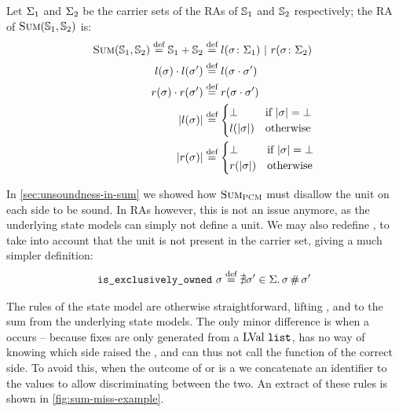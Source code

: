 Let $\Sigma_1$ and $\Sigma_2$ be the carrier sets of the RAs of $\mathbb S_1$ and $\mathbb S_2$ respectively; the RA of $\textsc{Sum}(\mathbb S_1,\mathbb S_2)$ is:
\begin{align*}
	\textsc{Sum}(\mathbb S_1, \mathbb S_2) \stackrel{\textnormal{def}}= \mathbb S_1+\mathbb S_2 &\stackrel{\textnormal{def}}= l(\sigma\colon \Sigma_1) ~|~ r(\sigma\colon \Sigma_2)\\
	l(\sigma)\cdot l(\sigma') &\stackrel{\textnormal{def}}= l(\sigma\cdot \sigma')\\
	r(\sigma)\cdot r(\sigma') &\stackrel{\textnormal{def}}= r(\sigma\cdot \sigma')\\
	|l(\sigma)|&\stackrel{\textnormal{def}}= \begin{cases}
 		\bot &\text{if}~ |\sigma|=\bot\\
 		l(|\sigma|) &\text{otherwise}
	 \end{cases}\\
	 |r(\sigma)|&\stackrel{\textnormal{def}}= \begin{cases}
 		\bot &\text{if}~ |\sigma|=\bot\\
 		r(|\sigma|) &\text{otherwise}
	 \end{cases}
\end{align*}

In \cref{sec:unsoundness-in-sum} we showed how $\textsc{Sum}_{\textsc{PCM}}$ must disallow the unit on each side to be sound. In RAs however, this is not an issue anymore, as the underlying state models can simply not define a unit. We may also redefine \isexowned, to take into account that the unit is not present in the carrier set, giving a much simpler definition: \begin{align*}
	\texttt{is\_exclusively\_owned}~\sigma \stackrel{\textnormal{def}}= \nexists \sigma'\in\Sigma\ldotp \sigma\operatorname{\#}\sigma'
\end{align*}

The rules of the \Sum{} state model are otherwise straightforward, lifting \execac, \consume{} and \produce{} to the sum from the underlying state models. The only minor difference is when a \Miss{} occurs -- because fixes are only generated from a $\text{LVal}~\texttt{list}$, \Sum{} has no way of knowing which side raised the \Miss, and can thus not call the \fix{} function of the correct side. To avoid this, when the outcome of \execac{} or \consume{} is a \Miss{} we concatenate an identifier to the values to allow discriminating between the two. An extract of these rules is shown in \autoref{fig:sum-miss-example}.

